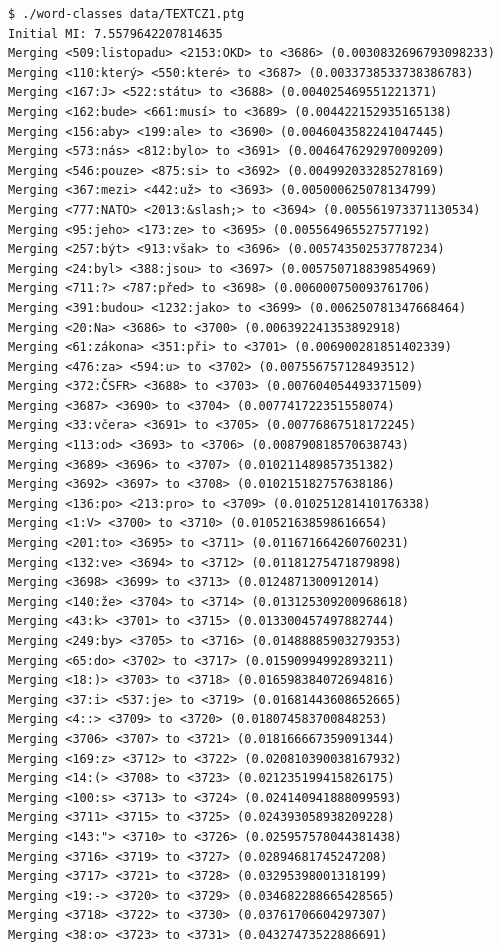 \documentclass[12pt,a4paper]{article}
\begin{document}
\begin{verbatim}
$ ./word-classes data/TEXTCZ1.ptg
Initial MI: 7.5579642207814635
Merging <509:listopadu> <2153:OKD> to <3686> (0.0030832696793098233)
Merging <110:který> <550:které> to <3687> (0.0033738533738386783)
Merging <167:J> <522:státu> to <3688> (0.004025469551221371)
Merging <162:bude> <661:musí> to <3689> (0.004422152935165138)
Merging <156:aby> <199:ale> to <3690> (0.0046043582241047445)
Merging <573:nás> <812:bylo> to <3691> (0.004647629297009209)
Merging <546:pouze> <875:si> to <3692> (0.004992033285278169)
Merging <367:mezi> <442:už> to <3693> (0.005000625078134799)
Merging <777:NATO> <2013:&slash;> to <3694> (0.005561973371130534)
Merging <95:jeho> <173:ze> to <3695> (0.005564965527577192)
Merging <257:být> <913:však> to <3696> (0.005743502537787234)
Merging <24:byl> <388:jsou> to <3697> (0.005750718839854969)
Merging <711:?> <787:před> to <3698> (0.006000750093761706)
Merging <391:budou> <1232:jako> to <3699> (0.006250781347668464)
Merging <20:Na> <3686> to <3700> (0.006392241353892918)
Merging <61:zákona> <351:při> to <3701> (0.006900281851402339)
Merging <476:za> <594:u> to <3702> (0.007556757128493512)
Merging <372:ČSFR> <3688> to <3703> (0.007604054493371509)
Merging <3687> <3690> to <3704> (0.007741722351558074)
Merging <33:včera> <3691> to <3705> (0.00776867518172245)
Merging <113:od> <3693> to <3706> (0.008790818570638743)
Merging <3689> <3696> to <3707> (0.010211489857351382)
Merging <3692> <3697> to <3708> (0.010215182757638186)
Merging <136:po> <213:pro> to <3709> (0.010251281410176338)
Merging <1:V> <3700> to <3710> (0.010521638598616654)
Merging <201:to> <3695> to <3711> (0.011671664260760231)
Merging <132:ve> <3694> to <3712> (0.01181275471879898)
Merging <3698> <3699> to <3713> (0.0124871300912014)
Merging <140:že> <3704> to <3714> (0.013125309200968618)
Merging <43:k> <3701> to <3715> (0.013300457497882744)
Merging <249:by> <3705> to <3716> (0.01488885903279353)
Merging <65:do> <3702> to <3717> (0.01590994992893211)
Merging <18:)> <3703> to <3718> (0.016598384072694816)
Merging <37:i> <537:je> to <3719> (0.01681443608652665)
Merging <4::> <3709> to <3720> (0.018074583700848253)
Merging <3706> <3707> to <3721> (0.018166667359091344)
Merging <169:z> <3712> to <3722> (0.020810390038167932)
Merging <14:(> <3708> to <3723> (0.021235199415826175)
Merging <100:s> <3713> to <3724> (0.024140941888099593)
Merging <3711> <3715> to <3725> (0.024393058938209228)
Merging <143:"> <3710> to <3726> (0.025957578044381438)
Merging <3716> <3719> to <3727> (0.02894681745247208)
Merging <3717> <3721> to <3728> (0.03295398001318199)
Merging <19:-> <3720> to <3729> (0.034682288665428565)
Merging <3718> <3722> to <3730> (0.03761706604297307)
Merging <38:o> <3723> to <3731> (0.04327473522886691)
\end{verbatim}
\end{document}
